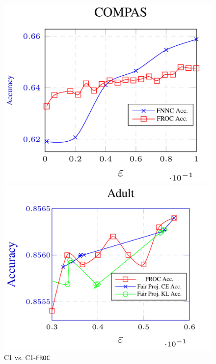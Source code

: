 \documentclass{article}
\newcommand{\ouralgo}{\texttt{FROC}}
\begin{document}
\begin{figure}
    \centering
    \hspace{-2cm}
    \begin{minipage}{0.3\linewidth}
         \centering
         \includegraphics[scale = 0.3]{Images/fnnc_compas_AAAI25.png}
         \caption{C1  vs. C1-\ouralgo}
        \label{fig:COMPAS_acc}
     \end{minipage}
     \begin{minipage}{0.3\linewidth}
         \centering
        \includegraphics[scale = 0.3]{Images/rf_meo.png}

\end{minipage}
\end{figure}
\end{document}
